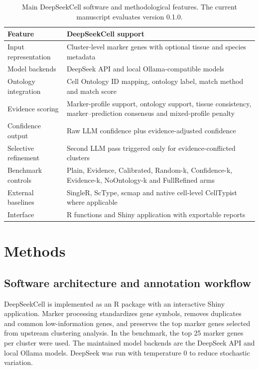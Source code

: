 \documentclass[unnumsec,webpdf,contemporary,large,numbered]{oup-authoring-template}
\begin{document}
\begin{table}[!t]
\caption{Main DeepSeekCell software and methodological features. The current manuscript evaluates version 0.1.0.}
\label{tab:features}
\centering
\begin{tabularx}{\textwidth}{p{}X}
\toprule
Feature & DeepSeekCell support\\
\midrule
Input representation & Cluster-level marker genes with optional tissue and species metadata\\
Model backends & DeepSeek API and local Ollama-compatible models\\
Ontology integration & Cell Ontology ID mapping, ontology label, match method and match score\\
Evidence scoring & Marker-profile support, ontology support, tissue consistency, marker--prediction consensus and mixed-profile penalty\\
Confidence output & Raw LLM confidence plus evidence-adjusted confidence\\
Selective refinement & Second LLM pass triggered only for evidence-conflicted clusters\\
Benchmark controls & Plain, Evidence, Calibrated, Random-k, Confidence-k, Evidence-k, NoOntology-k and FullRefined arms\\
External baselines & SingleR, ScType, scmap and native cell-level CellTypist where applicable\\
Interface & R functions and Shiny application with exportable reports\\
\bottomrule
\end{tabularx}
\end{table}

\FloatBarrier

\section{Methods}

\subsection{Software architecture and annotation workflow}

DeepSeekCell is implemented as an R package with an interactive Shiny application. Marker processing standardizes gene symbols, removes duplicates and common low-information genes, and preserves the top marker genes selected from upstream clustering analysis. In the benchmark, the top 25 marker genes per cluster were used. The maintained model backends are the DeepSeek API and local Ollama models. DeepSeek was run with temperature 0 to reduce stochastic variation.
\end{document}
